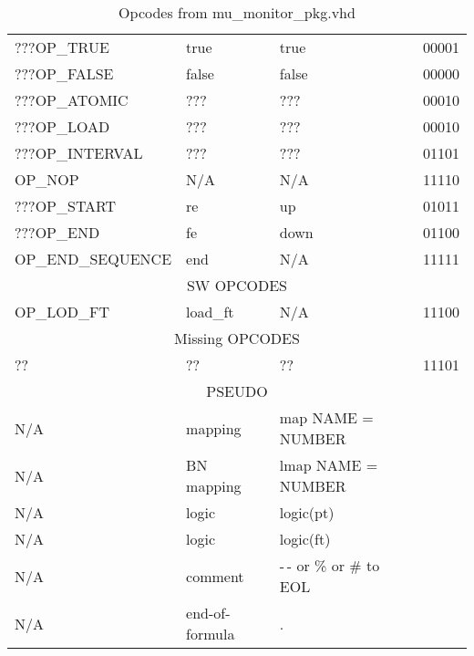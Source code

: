 \documentclass{article}
\begin{document}
\begin{table}[htb]
\begin{tabular}{|l|l|l|l|}
\hline
???OP\_TRUE  & true & true & 00001 \\
???OP\_FALSE  & false & false & 00000 \\
???OP\_ATOMIC  & ??? & ??? & 00010 \\
???OP\_LOAD  & ??? & ??? & 00010 \\
???OP\_INTERVAL  & ??? & ??? & 01101 \\
OP\_NOP & N/A & N/A & 11110 \\
???OP\_START & re & up & 01011 \\
???OP\_END & fe & down & 01100 \\
OP\_END\_SEQUENCE & end & N/A & 11111 \\
\hline
\multicolumn{4}{|c|}{SW OPCODES}\\
\hline
OP\_LOD\_FT& load\_ft & N/A & 11100 \\
\hline
\multicolumn{4}{|c|}{Missing OPCODES}\\
\hline
?? & ?? & ?? & 11101 \\
\hline
\multicolumn{4}{|c|}{PSEUDO}\\
\hline
N/A & mapping & map NAME = NUMBER & \\
N/A & BN mapping & lmap NAME = NUMBER & \\
N/A & logic  & logic(pt) & \\
N/A & logic  & logic(ft) & \\
N/A & comment & -\,- or \% or \# to EOL & \\
N/A & end-of-formula & . & \\
\hline
\end{tabular}
\caption{Opcodes from mu\_monitor\_pkg.vhd}
\end{table}
\end{document}
